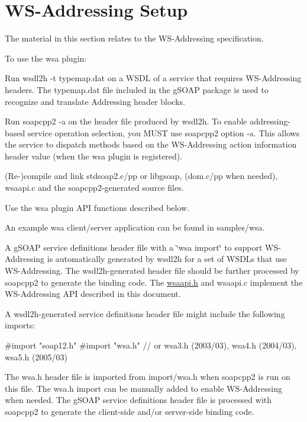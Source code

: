 \hypertarget{wsa__0_wsa_1}{}\section{WS-\/Addressing Setup}\label{wsa__0_wsa_1}
The material in this section relates to the WS-\/Addressing specification.

To use the wsa plugin:
\begin{DoxyEnumerate}
\item Run wsdl2h -\/t typemap.dat on a WSDL of a service that requires WS-\/Addressing headers. The typemap.dat file included in the gSOAP package is used to recognize and translate Addressing header blocks.
\item Run soapcpp2 -\/a on the header file produced by wsdl2h. To enable addressing-\/based service operation selection, you MUST use soapcpp2 option -\/a. This allows the service to dispatch methods based on the WS-\/Addressing action information header value (when the wsa plugin is registered).
\item (Re-\/)compile and link stdsoap2.c/pp or libgsoap, (dom.c/pp when needed), wsaapi.c and the soapcpp2-\/generated source files.
\item Use the wsa plugin API functions described below.
\end{DoxyEnumerate}

An example wsa client/server application can be found in samples/wsa.

A gSOAP service definitions header file with a \char`\"{}wsa import\char`\"{} to support WS-\/Addressing is automatically generated by wsdl2h for a set of WSDLs that use WS-\/Addressing. The wsdl2h-\/generated header file should be further processed by soapcpp2 to generate the binding code. The \hyperlink{wsaapi_8h_source}{wsaapi.h} and wsaapi.c implement the WS-\/Addressing API described in this document.

A wsdl2h-\/generated service definitions header file might include the following imports:


\begin{DoxyCode}
#import "soap12.h"
#import "wsa.h" // or wsa3.h (2003/03), wsa4.h (2004/03), wsa5.h (2005/03)
\end{DoxyCode}


The wsa.h header file is imported from import/wsa.h when soapcpp2 is run on this file. The wsa.h import can be manually added to enable WS-\/Addressing when needed. The gSOAP service definitions header file is processed with soapcpp2 to generate the client-\/side and/or server-\/side binding code.

